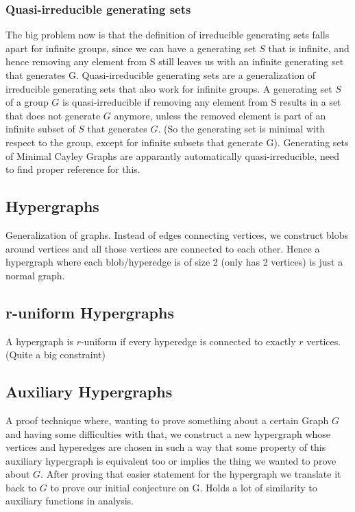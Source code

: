 \documentclass[a4paper,10pt]{article}
\numberwithin{equation}{section}
\theoremstyle{definition}
\begin{document}
        \subsubsection{Quasi-irreducible generating sets}
            The big problem now is that the definition of irreducible generating sets falls apart for infinite groups, since we can have a generating set \(S\) that is infinite, and hence removing any element from S still leaves us with an infinite generating set that generates G. 
            Quasi-irreducible generating sets are a generalization of irreducible generating sets that also work for infinite groups. 
            A generating set \(S\) of a group \(G\) is quasi-irreducible if removing any element from S results in a set that does not generate \(G\) anymore, 
            unless the removed element is part of an infinite subset of \(S\) that generates \(G\). (So the generating set is minimal with respect to the group, except for infinite subsets that generate G).
            Generating sets of Minimal Cayley Graphs are apparantly automatically quasi-irreducible, need to find proper reference for this.
        \subsubsection{}
    \subsection{Hypergraphs}
        Generalization of graphs. Instead of edges connecting vertices, we construct blobs around vertices and all those vertices are connected to each other. Hence a hypergraph where each blob/hyperedge is of size 2 (only has 2 vertices) is just a normal graph.
    \subsection{r-uniform Hypergraphs}
        A hypergraph is \(r\)-uniform if every hyperedge is connected to exactly \(r\) vertices. (Quite a big constraint)
    \subsection{Auxiliary Hypergraphs}
        A proof technique where, wanting to prove something about a certain Graph \(G\) and having some difficulties with that, we construct a new hypergraph whose vertices and hyperedges are chosen in such a way that some property of this auxiliary hypergraph
        is equivalent too or implies the thing we wanted to prove about \(G\). After proving that easier statement for the hypergraph we translate it back to \(G\) to prove our initial conjecture on G. Holds a lot of similarity to auxiliary functions in analysis.
\end{document}
